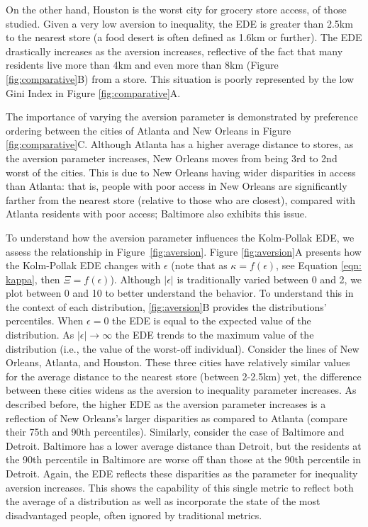 \documentclass[final,3p,times,onecolumn,sort&compress]{elsarticle}
\begin{document}
On the other hand, Houston is the worst city for grocery store access, of those studied.
Given a very low aversion to inequality, the EDE is greater than 2.5km to the nearest store (a food desert is often defined as 1.6km or further).
The EDE drastically increases as the aversion increases, reflective of the fact that many residents live more than 4km and even more than 8km (Figure \ref{fig:comparative}B) from a store.
This situation is poorly represented by the low Gini Index in Figure \ref{fig:comparative}A.

The importance of varying the aversion parameter is demonstrated by preference ordering between the cities of Atlanta and New Orleans in Figure \ref{fig:comparative}C.
Although Atlanta has a higher average distance to stores, as the aversion parameter increases, New Orleans moves from being 3rd to 2nd worst of the cities. 
This is due to New Orleans having wider disparities in access than Atlanta: that is, people with poor access in New Orleans are significantly farther from the nearest store (relative to those who are closest), compared with Atlanta residents with poor access; Baltimore also exhibits this issue.

To understand how the aversion parameter influences the Kolm-Pollak EDE, we assess the relationship in Figure~\ref{fig:aversion}.
Figure \ref{fig:aversion}A presents how the Kolm-Pollak EDE changes with $\epsilon$ (note that as $\kappa=f(\epsilon)$, see Equation \ref{eqn: kappa}, then $\Xi=f(\epsilon)$).
Although $\left|\epsilon\right|$ is traditionally varied between 0 and 2, we plot between 0 and 10 to better understand the behavior.
To understand this in the context of each distribution, \autoref{fig:aversion}B provides the distributions' percentiles.
When $\epsilon=0$ the EDE is equal to the expected value of the distribution.
As $\left|\epsilon\right| \rightarrow \infty$ the EDE trends to the maximum value of the distribution (i.e., the value of the worst-off individual).
Consider the lines of New Orleans, Atlanta, and Houston.
These three cities have relatively similar values for the average distance to the nearest store (between 2-2.5km) yet, the difference between these cities widens as the aversion to inequality parameter increases. 
As described before, the higher EDE as the aversion parameter increases is a reflection of New Orleans’s larger disparities as compared to Atlanta (compare their 75th and 90th percentiles).
Similarly, consider the case of Baltimore and Detroit.
Baltimore has a lower average distance than Detroit, but the residents at the 90th percentile in Baltimore are worse off than those at the 90th percentile in Detroit.
Again, the EDE reflects these disparities as the parameter for inequality aversion increases.
This shows the capability of this single metric to reflect both the average of a distribution as well as incorporate the state of the most disadvantaged people, often ignored by traditional metrics.
\end{document}
